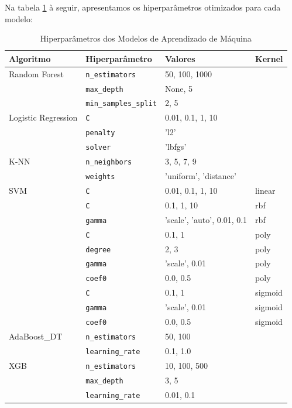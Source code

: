 \documentclass[a4paper]{article}
\theoremstyle{plain}
\theoremstyle{definition}
\begin{document}
Na tabela \ref{tab:hyperparams_all} à seguir, apresentamos os hiperparâmetros otimizados para cada modelo:

\begin{table}[H]
\centering
\caption{Hiperparâmetros dos Modelos de Aprendizado de Máquina}
\label{tab:hyperparams_all}
\begin{tabularx}{\textwidth}{lXll}
\hline
\textbf{Algoritmo} & \textbf{Hiperparâmetro} & \textbf{Valores} & \textbf{Kernel} \\
\hline
Random Forest & \texttt{n\_estimators} & 50, 100, 1000 & \\
& \texttt{max\_depth} & None, 5 & \\
& \texttt{min\_samples\_split} & 2, 5 & \\
\hline
Logistic Regression & \texttt{C} & 0.01, 0.1, 1, 10 & \\
& \texttt{penalty} & 'l2' & \\
& \texttt{solver} & 'lbfgs' & \\
\hline
K-NN & \texttt{n\_neighbors} & 3, 5, 7, 9 & \\
& \texttt{weights} & 'uniform', 'distance' & \\
\hline
SVM & \texttt{C} & 0.01, 0.1, 1, 10 & linear \\
& \texttt{C} & 0.1, 1, 10 & rbf \\
& \texttt{gamma} & 'scale', 'auto', 0.01, 0.1 & rbf \\
& \texttt{C} & 0.1, 1 & poly \\
& \texttt{degree} & 2, 3 & poly \\
& \texttt{gamma} & 'scale', 0.01 & poly \\
& \texttt{coef0} & 0.0, 0.5 & poly \\
& \texttt{C} & 0.1, 1 & sigmoid \\
& \texttt{gamma} & 'scale', 0.01 & sigmoid \\
& \texttt{coef0} & 0.0, 0.5 & sigmoid \\
\hline
AdaBoost\_DT & \texttt{n\_estimators} & 50, 100 & \\
& \texttt{learning\_rate} & 0.1, 1.0 & \\
\hline
XGB & \texttt{n\_estimators} & 10, 100, 500 & \\
& \texttt{max\_depth} & 3, 5 & \\
& \texttt{learning\_rate} & 0.01, 0.1 & \\
\hline
\end{tabularx}
\end{table}
\end{document}
